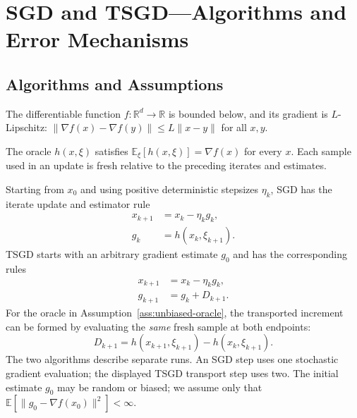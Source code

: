 \section{SGD and TSGD---Algorithms and Error Mechanisms}
\label{sec:algorithms-and-errors}

\subsection{Algorithms and Assumptions}
\label{subsec:algorithms-and-assumptions}

\begin{assumption}
\label{ass:smooth-objective}
The differentiable function $f:\mathbb{R}^d\to\mathbb{R}$ is bounded below,
and its gradient is $L$-Lipschitz:
$\|\nabla f(x)-\nabla f(y)\|\leq L\|x-y\|$ for all $x,y$.
\end{assumption}

\begin{assumption}
\label{ass:unbiased-oracle}
The oracle $h(x,\xi)$ satisfies
$\mathbb{E}_{\xi}[h(x,\xi)]=\nabla f(x)$ for every $x$. Each sample used in
an update is fresh relative to the preceding iterates and estimates.
\end{assumption}

Starting from $x_0$ and using positive deterministic stepsizes $\eta_k$,
SGD has the iterate update and estimator rule
\begin{align}
x_{k+1}&=x_k-\eta_k g_k, \label{eq:sgd-update}\\
g_k&=h(x_k,\xi_{k+1}). \label{eq:sgd-estimate}
\end{align}
TSGD starts with an arbitrary gradient estimate $g_0$ and has the
corresponding rules
\begin{align}
x_{k+1}&=x_k-\eta_k g_k, \label{eq:tsgd-iterate}\\
g_{k+1}&=g_k+D_{k+1}. \label{eq:tsgd-estimate}
\end{align}
For the oracle in Assumption~\ref{ass:unbiased-oracle}, the transported
increment can be formed by evaluating the \emph{same} fresh sample at both
endpoints:
\begin{equation}
\label{eq:shared-sample-increment}
D_{k+1}
  =h(x_{k+1},\xi_{k+1})-h(x_k,\xi_{k+1}).
\end{equation}
The two algorithms describe separate runs. An SGD step uses one stochastic
gradient evaluation; the displayed TSGD transport step uses two. The
initial estimate $g_0$ may be random or biased; we assume only that
$\mathbb{E}[\|g_0-\nabla f(x_0)\|^2]<\infty$.

